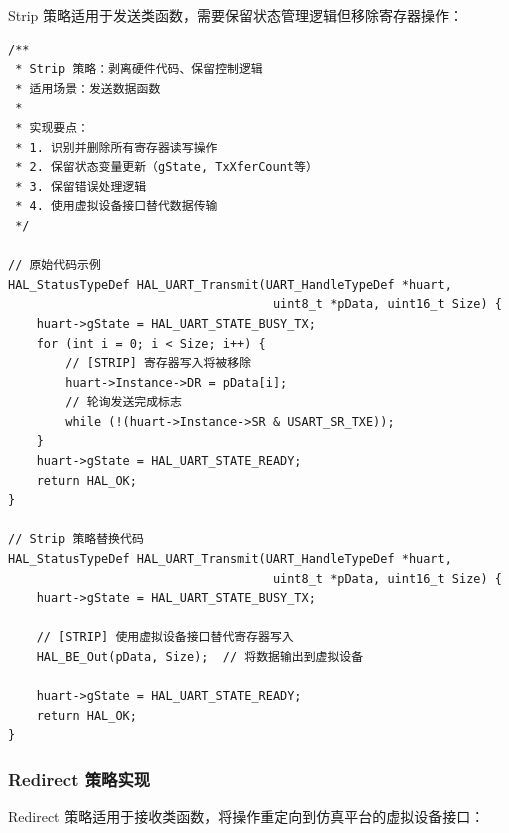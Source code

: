 Strip 策略适用于发送类函数，需要保留状态管理逻辑但移除寄存器操作：

\begin{lstlisting}[style=CStyle,abovecaptionskip=0pt,belowcaptionskip=0pt]
/**
 * Strip 策略：剥离硬件代码、保留控制逻辑
 * 适用场景：发送数据函数
 *
 * 实现要点：
 * 1. 识别并删除所有寄存器读写操作
 * 2. 保留状态变量更新（gState, TxXferCount等）
 * 3. 保留错误处理逻辑
 * 4. 使用虚拟设备接口替代数据传输
 */

// 原始代码示例
HAL_StatusTypeDef HAL_UART_Transmit(UART_HandleTypeDef *huart,
                                     uint8_t *pData, uint16_t Size) {
    huart->gState = HAL_UART_STATE_BUSY_TX;
    for (int i = 0; i < Size; i++) {
        // [STRIP] 寄存器写入将被移除
        huart->Instance->DR = pData[i];
        // 轮询发送完成标志
        while (!(huart->Instance->SR & USART_SR_TXE));
    }
    huart->gState = HAL_UART_STATE_READY;
    return HAL_OK;
}

// Strip 策略替换代码
HAL_StatusTypeDef HAL_UART_Transmit(UART_HandleTypeDef *huart,
                                     uint8_t *pData, uint16_t Size) {
    huart->gState = HAL_UART_STATE_BUSY_TX;
    
    // [STRIP] 使用虚拟设备接口替代寄存器写入
    HAL_BE_Out(pData, Size);  // 将数据输出到虚拟设备
    
    huart->gState = HAL_UART_STATE_READY;
    return HAL_OK;
}
\end{lstlisting}

\subsubsection{Redirect 策略实现}

Redirect 策略适用于接收类函数，将操作重定向到仿真平台的虚拟设备接口：

